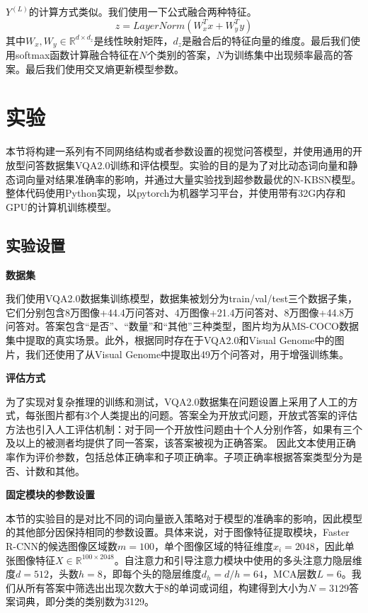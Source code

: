 $Y^{(L)}$的计算方式类似。我们使用一下公式融合两种特征。
\begin{equation}
z = LayerNorm(W_x^Tx + W_y^Ty)
\end{equation}
其中$W_x, W_y \in \mathbb{R}^{d \times d_z}$是线性映射矩阵，$d_z$是融合后的特征向量的维度。最后我们使用softmax函数计算融合特征在$N$个类别的答案，$N$为训练集中出现频率最高的答案。最后我们使用交叉熵更新模型参数。

\section{实验}
本节将构建一系列有不同网络结构或者参数设置的视觉问答模型，并使用通用的开放型问答数据集VQA2.0训练和评估模型。实验的目的是为了对比动态词向量和静态词向量对结果准确率的影响，并通过大量实验找到超参数最优的N-KBSN模型。整体代码使用Python实现，以pytorch为机器学习平台，并使用带有32G内存和GPU的计算机训练模型。

\subsection{实验设置}
\textbf{数据集}

我们使用VQA2.0数据集训练模型，数据集被划分为train/val/test三个数据子集，它们分别包含8万图像+44.4万问答对、4万图像+21.4万问答对、8万图像+44.8万问答对。答案包含“是否”、“数量”和“其他”三种类型，图片均为从MS-COCO数据集中提取的真实场景。此外，根据同时存在于VQA2.0和Visual Genome中的图片，我们还使用了从Visual Genome中提取出49万个问答对，用于增强训练集。

\textbf{评估方式}

为了实现对复杂推理的训练和测试，VQA2.0数据集在问题设置上采用了人工的方式，每张图片都有3个人类提出的问题。答案全为开放式问题，开放式答案的评估方法也引入人工评估机制：对于同一个开放性问题由十个人分别作答，如果有三个及以上的被测者均提供了同一答案，该答案被视为正确答案。
因此文本使用正确率作为评价参数，包括总体正确率和子项正确率。子项正确率根据答案类型分为是否、计数和其他。

\textbf{固定模块的参数设置}

本节的实验目的是对比不同的词向量嵌入策略对于模型的准确率的影响，因此模型的其他部分因保持相同的参数设置。具体来说，对于图像特征提取模块，Faster R-CNN的候选图像区域数$m = 100$，单个图像区域的特征维度$x_i = 2048$，因此单张图像特征$X \in \mathbb{R}^{100 \times 2048}$。自注意力和引导注意力模块中使用的多头注意力隐层维度$d=512$，头数$h=8$，即每个头的隐层维度$d_h=d/h=64$，MCA层数$L=6$。我们从所有答案中筛选出出现次数大于8的单词或词组，构建得到大小为$N=3129$答案词典，即分类的类别数为3129。

